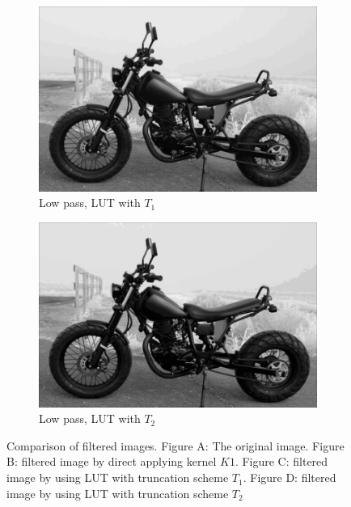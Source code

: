 \documentclass[12pt]{amsart}
\theoremstyle{definition}
\theoremstyle{remark}
\numberwithin{thm}{section}
\begin{document}
\begin{figure}[h]
\begin{subfigure}[b]{0.4\textwidth} \includegraphics[width=\textwidth]{motor_lut_212.png} \caption{Low pass, LUT with $T_1$} %
\end{subfigure}
\begin{subfigure}[b]{0.4\textwidth} \includegraphics[width=\textwidth]{motor_lut_424.png} \caption{Low pass, LUT with $T_2$} \end{subfigure}
\caption{Comparison of filtered images. Figure A: The original image. Figure B: filtered image by direct applying kernel $K1$. Figure C: filtered image by using LUT with truncation scheme $T_1$. Figure D: filtered image by using LUT with truncation scheme $T_2$}
\end{figure}
\end{document}
